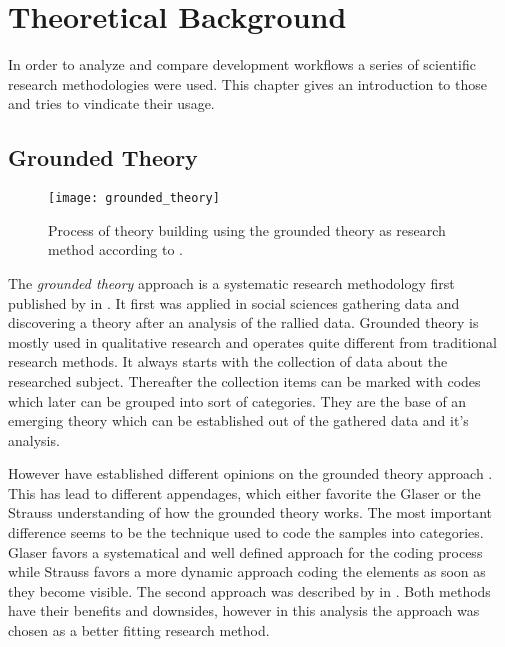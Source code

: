 \chapter{Theoretical Background} %
\label{chap:theoretical background}

In order to analyze and compare development workflows a series of scientific
research methodologies were used. This chapter gives an introduction to those
and tries to vindicate their usage.

\section{Grounded Theory} %

\begin{figure}[htbp]
  \centering
  \texttt{[image: grounded\_theory]}
  \caption{Process of theory building using the grounded theory as research
    method according to \citeauthor{Strauss1990} \cite{Pandit1996}.}
\end{figure}

The \emph{grounded theory} approach is a systematic research methodology first
published by \textcite{Glaser1967} in \citeyear{Glaser1967}. It first was
applied in social sciences gathering data and discovering a theory after an
analysis of the rallied data. Grounded theory is mostly used in qualitative
research and operates quite different from traditional research methods. It
always starts with the collection of data about the researched subject.
Thereafter the collection items can be marked with codes which later can be
grouped into sort of categories. They are the base of an emerging theory which
can be established out of the gathered data and it's analysis.

However \citeauthor{Glaser1967} have established different opinions on the
grounded theory approach \cite{Heath2004}. This has lead to different
appendages, which either favorite the Glaser or the Strauss understanding of
how the grounded theory works. The most important difference seems to be the
technique used to code the samples into categories. Glaser favors a
systematical and well defined approach for the coding process while Strauss
favors a more dynamic approach coding the elements as soon as they become
visible. The second approach was described by \textcite{Strauss1990} in
\citeyear{Strauss1990}. Both methods have their benefits and downsides, however
in this analysis the \citeauthor{Strauss1990} approach was chosen as a better
fitting research method.

